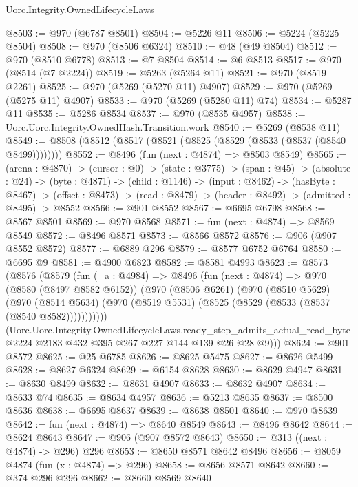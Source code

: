 \begin{lexlean}{Uorc.Integrity.OwnedLifecycleLaws}
\begin{coremodule}
@8503 := @970 (@6787 @8501)
@8504 := @5226 @11
@8506 := @5224 (@5225 @8504)
@8508 := @970 (@8506 @6324)
@8510 := @48 (@49 @8504)
@8512 := @970 (@8510 @6778)
@8513 := @7 @8504
@8514 := @6 @8513
@8517 := @970 (@8514 (@7 @2224))
@8519 := @5263 (@5264 @11)
@8521 := @970 (@8519 @2261)
@8525 := @970 (@5269 (@5270 @11) @4907)
@8529 := @970 (@5269 (@5275 @11) @4907)
@8533 := @970 (@5269 (@5280 @11) @74)
@8534 := @5287 @11
@8535 := @5286 @8534
@8537 := @970 (@8535 @4957)
@8538 := Uorc.Uorc.Integrity.OwnedHash.Transition.work
@8540 := @5269 (@8538 @11)
@8549 := @8508 (@8512 (@8517 (@8521 (@8525 (@8529 (@8533 (@8537 (@8540 @8499))))))))
@8552 := @8496 (fun (next : @4874) => @8503 @8549)
@8565 := (arena : @4870) ->
  (cursor : @0) ->
  (state : @3775) ->
  (span : @45) ->
  (absolute : @24) ->
  (byte : @4871) ->
  (child : @1146) ->
  (input : @8462) ->
  (hasByte : @8467) ->
  (offset : @8473) -> (read : @8479) -> (header : @8492) -> (admitted : @8495) -> @8552
@8566 := @901 @8552
@8567 := @6695 @6798
@8568 := @8567 @8501
@8569 := @970 @8568
@8571 := fun (next : @4874) => @8569 @8549
@8572 := @8496 @8571
@8573 := @8566 @8572
@8576 := @906 (@907 @8552 @8572)
@8577 := @6889 @296
@8579 := @8577 @6752 @6764
@8580 := @6695 @9
@8581 := @4900 @6823
@8582 := @8581 @4993
@8623 := @8573
    (@8576
      (@8579
        (fun (_a : @4984) =>
        @8496
          (fun (next : @4874) =>
          @970
            (@8580 (@8497 @8582 @6152))
            (@970
              (@8506 @6261)
              (@970
                (@8510 @5629)
                (@970
                  (@8514 @5634)
                  (@970 (@8519 @5531) (@8525 (@8529 (@8533 (@8537 (@8540 @8582)))))))))))
        (Uorc.Uorc.Integrity.OwnedLifecycleLaws.ready_step_admits_actual_read_byte
          @2224
          @2183
          @432
          @395
          @267
          @227
          @144
          @139
          @26
          @28
          @9)))
@8624 := @901 @8572
@8625 := @25 @6785
@8626 := @8625 @5475
@8627 := @8626 @5499
@8628 := @8627 @6324
@8629 := @6154 @8628
@8630 := @8629 @4947
@8631 := @8630 @8499
@8632 := @8631 @4907
@8633 := @8632 @4907
@8634 := @8633 @74
@8635 := @8634 @4957
@8636 := @5213 @8635
@8637 := @8500 @8636
@8638 := @6695 @8637
@8639 := @8638 @8501
@8640 := @970 @8639
@8642 := fun (next : @4874) => @8640 @8549
@8643 := @8496 @8642
@8644 := @8624 @8643
@8647 := @906 (@907 @8572 @8643)
@8650 := @313 ((next : @4874) -> @296) @296
@8653 := @8650 @8571 @8642 @8496
@8656 := @8059 @4874 (fun (x : @4874) => @296)
@8658 := @8656 @8571 @8642
@8660 := @374 @296 @296
@8662 := @8660 @8569 @8640

\end{coremodule}
\end{lexlean}
